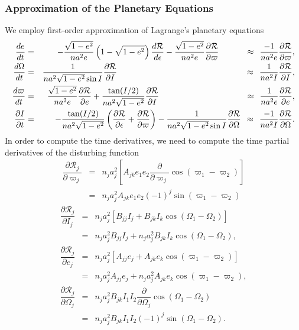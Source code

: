 \documentclass [12pt, a4paper] {article}
\newcommand{\pdiff}[2]
{
	\dfrac{\partial #1}{\partial #2}
}
\newcommand{\diff}[2]
{
	\dfrac{d #1}{d #2}
}
\begin{document}
\subsubsection{Approximation of the Planetary Equations}
We employ first-order approximation of Lagrange's planetary equations 
\begin {eqnarray}
    \diff{e}{t}
    &=&
    -\frac{\sqrt{1 - e^2}}{na^2e}
    \left(1 - \sqrt{1 - e^2}\right)\diff{\mathcal{R}}{\epsilon}
    - 
    \frac{\sqrt{1 - e^2}}{na^2e}\pdiff{\mathcal{R}}{\varpi}
    \hspace{0.96cm}
    \:\:\approx\:\:
    \frac{-1}{na^2e}\pdiff{\mathcal{R}}{\varpi},
    \\
    \diff{\Omega}{t}
    &=& 
    \frac{1}{na^2\sqrt{1 - e^2}\sin I}\pdiff{\mathcal{R}}{I}
    \hspace{5.28cm}\:\:\approx\:\: 
    \frac{1}{na^2I}\pdiff{\mathcal{R}}{I},
    \\
    \diff{\varpi}{t}
    &=& 
    \frac{\sqrt{1 - e^2}}{na^2e}
    \pdiff{\mathcal{R}}{e}
    + 
    \frac{\tan(I/2)}{na^2\sqrt{1 - e^2}}
    \pdiff{\mathcal{R}}{I}    
    \hspace{3.51cm}\:\:\approx\:\: 
    \frac{1}{na^2e}\pdiff{\mathcal{R}}{e},
    \\
    \pdiff{I}{t}
    &=&
    -\frac{\tan(I/2)}{na^2\sqrt{1-e^2}}
    \left(
        \pdiff{\mathcal{R}}{\epsilon} + \pdiff{\mathcal{R}}{\varpi}
    \right)
    -
    \frac{1}{na^2\sqrt{1-e^2}\sin I}\pdiff{\mathcal{R}}{\Omega}
    \:\:\approx\:\:
    \frac{-1}{na^2I}\pdiff{\mathcal{R}}{\Omega}.
\end {eqnarray}
In order to compute the time derivatives, we need to compute the time partial derivatives 
of the disturbing function 
\begin {eqnarray}
    \pdiff{\mathcal{R}_j}{\varpi_j}
    &=& 
    n_ja_j^2
    \left[
        A_{jk}e_1e_2\pdiff{}{\varpi_j}\cos(\varpi_1 - \varpi_2)
    \right]
    \\
    &=& 
    n_ja_j^2A_{jk}e_1e_2(-1)^j\sin(\varpi_1 - \varpi_2)
\end {eqnarray}
\begin {eqnarray}
    \pdiff{\mathcal{R}_j}{I_j}
    &=& 
    n_ja_j^2
    \left[
        B_{jj}I_j + B_{jk}I_k\cos(\Omega_1 - \Omega_2)
    \right]
    \\
    &=&
    n_ja_j^2B_{jj}I_j
    +
    n_ja_j^2B_{jk}I_k\cos(\Omega_1 - \Omega_2),
    \\
    \pdiff{\mathcal{R}_j}{e_j}
    &=& 
    n_ja_j^2
    \left[
        A_{jj}e_j + A_{jk}e_k\cos(\varpi_1 - \varpi_2)
    \right]
    \\
    &=&
    n_ja_j^2A_{jj}e_j + n_ja_j^2A_{jk}e_k\cos(\varpi_1 - \varpi_2),
    \\
    \pdiff{\mathcal{R}_j}{\Omega_j}
    &=&
    n_ja_j^2B_{jk}I_1I_2\pdiff{}{\Omega_j}\cos(\Omega_1 - \Omega_2)
    \\
    &=&
    n_ja_j^2B_{jk}I_1I_2(-1)^j\sin(\Omega_1 - \Omega_2).
\end {eqnarray}
\end{document}
